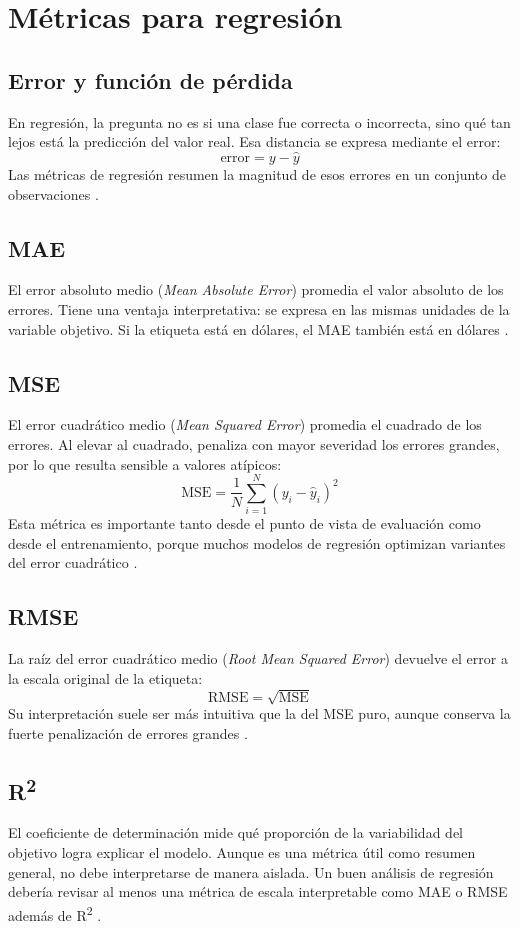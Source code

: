 \documentclass[12pt]{article}
\begin{document}
\section{Métricas para regresión}
\subsection{Error y función de pérdida}
En regresión, la pregunta no es si una clase fue correcta o incorrecta, sino qué tan lejos está la predicción del valor real. Esa distancia se expresa mediante el error:
\[
\text{error} = y - \hat{y}
\]
Las métricas de regresión resumen la magnitud de esos errores en un conjunto de observaciones \cite{google_linear_loss}.

\subsection{MAE}
El error absoluto medio (\textit{Mean Absolute Error}) promedia el valor absoluto de los errores. Tiene una ventaja interpretativa: se expresa en las mismas unidades de la variable objetivo. Si la etiqueta está en dólares, el MAE también está en dólares \cite{google_linear_loss}.

\subsection{MSE}
El error cuadrático medio (\textit{Mean Squared Error}) promedia el cuadrado de los errores. Al elevar al cuadrado, penaliza con mayor severidad los errores grandes, por lo que resulta sensible a valores atípicos:
\[
\text{MSE} = \frac{1}{N}\sum_{i=1}^{N}(y_i - \hat{y}_i)^2
\]
Esta métrica es importante tanto desde el punto de vista de evaluación como desde el entrenamiento, porque muchos modelos de regresión optimizan variantes del error cuadrático \cite{google_linear_loss,google_metrics_glossary}.

\subsection{RMSE}
La raíz del error cuadrático medio (\textit{Root Mean Squared Error}) devuelve el error a la escala original de la etiqueta:
\[
\text{RMSE} = \sqrt{\text{MSE}}
\]
Su interpretación suele ser más intuitiva que la del MSE puro, aunque conserva la fuerte penalización de errores grandes \cite{google_linear_loss}.

\subsection{R\textsuperscript{2}}
El coeficiente de determinación mide qué proporción de la variabilidad del objetivo logra explicar el modelo. Aunque es una métrica útil como resumen general, no debe interpretarse de manera aislada. Un buen análisis de regresión debería revisar al menos una métrica de escala interpretable como MAE o RMSE además de R\textsuperscript{2} \cite{gcp_evaluate}.
\end{document}
